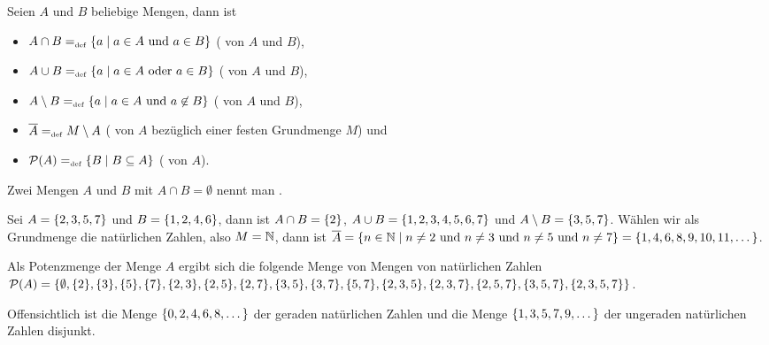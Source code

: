 \begin{definition}
\label{OpSet}
Seien $A$ und $B$ beliebige Mengen, dann ist
\begin{itemize}
%
\item $A \cap B =_{\mathrm{\scriptscriptstyle def}} \{a \mid a \in A \text{ und } a \in B\}$
( von $A$ und $B$)\index{$\cap$},
%
\item $A \cup B =_{\mathrm{\scriptscriptstyle def}} \{a \mid a \in A \text{ oder } a \in B\}$
( von $A$ und $B$)\index{$\cup$},
%
\item $A \setminus B =_{\mathrm{\scriptscriptstyle def}} \{a \mid a \in A \text{ und } a
\not\in B\}$ ( von $A$ und $B$)\index{$\setminus$},
%
\item $\overline{A} =_{\mathrm{\scriptscriptstyle def}} M \setminus A$ ( von $A$ 
bezüglich einer festen Grundmenge $M$) und
%
\item $\mathcal{P}(A) =_{\mathrm{\scriptscriptstyle def}} \{B \mid B \subseteq A\}$ 
( von $A$).
%
\end{itemize}
Zwei Mengen $A$ und $B$ mit $A \cap B = \emptyset$ nennt
man .

\begin{example}
Sei $A = \{2, 3, 5, 7\}$ und $B = \{1, 2, 4 , 6\}$, dann ist $A
\cap B = \{2\}$, $A \cup B = \{1, 2, 3, 4, 5, 6, \allowbreak 7\}$ und $A
\setminus B = \{3, 5, 7\}$. Wählen wir als Grundmenge die
natürlichen Zahlen, also $M = \mathbb N$, dann ist $\overline{A} = \{n \in \mathbb N
\mid n \not= 2 \text{ und } n \not= 3 \text{ und } n
\not= 5 \text{ und } n \not= 7\} = \{1, 4, 6, 8, 9, 10, 11,
\dots\}$. 

Als Potenzmenge der Menge $A$ ergibt sich die folgende Menge von Mengen
von natürlichen Zahlen $\mathcal{P}(A)
= \{\emptyset,\allowbreak \{2\},\allowbreak \{3\},
\allowbreak \{5\},\allowbreak \{7\}, \allowbreak \{2,3\},
\{2,5\}, \allowbreak \{2,7\}, \allowbreak \{3,5\}, \allowbreak\{3,7\},
\allowbreak \{5,7\},\allowbreak \{2,\allowbreak 3,5\},\allowbreak
\{2,3,7\},\allowbreak \{2,5,\allowbreak 7\}, \allowbreak \{3,\allowbreak 5,\allowbreak 7\},\{2,3,5,7\}\}$. 

Offensichtlich ist die Menge $\{0,2,4,6,8, \dots \}$ der geraden
natürlichen Zahlen und die Menge $\{1,3,5,7,9, \dots \}$ der
ungeraden natürlichen Zahlen disjunkt.
\end{example}
\end{definition}

